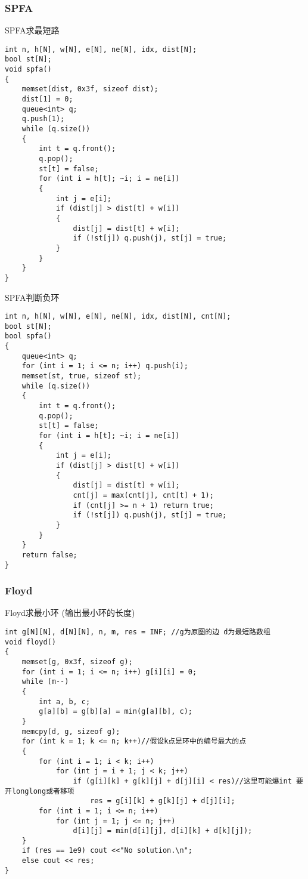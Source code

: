 \documentclass[a4paper, fontset=none]{ctexart}
\begin{document}
\subsubsection{SPFA}

SPFA求最短路

\begin{verbatim}
int n, h[N], w[N], e[N], ne[N], idx, dist[N];
bool st[N];
void spfa()
{
    memset(dist, 0x3f, sizeof dist);
    dist[1] = 0;
    queue<int> q;
    q.push(1);
    while (q.size())
    {
        int t = q.front();
        q.pop();
        st[t] = false;
        for (int i = h[t]; ~i; i = ne[i])
        {
            int j = e[i];
            if (dist[j] > dist[t] + w[i])
            {
                dist[j] = dist[t] + w[i];
                if (!st[j]) q.push(j), st[j] = true;
            }
        }
    }
}
\end{verbatim}

SPFA判断负环

\begin{verbatim}
int n, h[N], w[N], e[N], ne[N], idx, dist[N], cnt[N];
bool st[N];
bool spfa()
{
    queue<int> q;
    for (int i = 1; i <= n; i++) q.push(i);
    memset(st, true, sizeof st);
    while (q.size())
    {
        int t = q.front();
        q.pop();
        st[t] = false;
        for (int i = h[t]; ~i; i = ne[i])
        {
            int j = e[i];
            if (dist[j] > dist[t] + w[i])
            {
                dist[j] = dist[t] + w[i];
                cnt[j] = max(cnt[j], cnt[t] + 1);
                if (cnt[j] >= n + 1) return true;
                if (!st[j]) q.push(j), st[j] = true;
            }
        }
    }
    return false;
}
\end{verbatim}
\subsubsection{Floyd}

Floyd求最小环 (输出最小环的长度)

\begin{verbatim}
int g[N][N], d[N][N], n, m, res = INF; //g为原图的边 d为最短路数组
void floyd()
{
    memset(g, 0x3f, sizeof g);
    for (int i = 1; i <= n; i++) g[i][i] = 0;
    while (m--)
    {
        int a, b, c;
        g[a][b] = g[b][a] = min(g[a][b], c);
    }
    memcpy(d, g, sizeof g);
    for (int k = 1; k <= n; k++)//假设k点是环中的编号最大的点
    {
        for (int i = 1; i < k; i++)
            for (int j = i + 1; j < k; j++)
                if (g[i][k] + g[k][j] + d[j][i] < res)//这里可能爆int 要开longlong或者移项
                    res = g[i][k] + g[k][j] + d[j][i];
        for (int i = 1; i <= n; i++)
            for (int j = 1; j <= n; j++)
                d[i][j] = min(d[i][j], d[i][k] + d[k][j]);
    }
    if (res == 1e9) cout <<"No solution.\n";
    else cout << res;
}
\end{verbatim}
\end{document}
